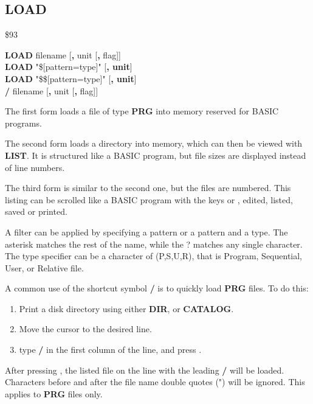 
\newpage
\subsection{LOAD}
\begin{description}[leftmargin=2cm,style=nextline]
\item [Token:] \$93
\item [Format:] {\bf LOAD} filename [{\bf,} unit [{\bf,} flag]] \\
                {\bf LOAD} "\$[pattern=type]" [{\bf, unit}] \\
                {\bf LOAD} "\$\$[pattern=type]" [{\bf, unit}] \\
                {\bf /} filename [{\bf,} unit [{\bf,} flag]]

\item [Usage:] The first form loads a file of type
   {\bf PRG} into memory reserved for BASIC programs.

The second form loads a directory into memory, which can then be viewed
with {\bf LIST}. It is structured like a BASIC program,
but file sizes are displayed instead of line numbers.

The third form is similar to the second one, but the files are numbered.
This listing can be scrolled like a BASIC program with the keys 
or , edited, listed, saved or printed.

A filter can be applied by specifying a pattern or a pattern and a type.
The asterisk \* matches the rest of the name, while the ? matches any single character.
The type specifier can be a character of (P,S,U,R), that is Program, Sequential, User,
or Relative file.

   A common use of the shortcut symbol {\bf /} is to quickly load
   {\bf PRG} files. To do this:

    \begin{enumerate}
    \item Print a disk directory using either {\bf DIR}, or {\bf CATALOG}.
    \item Move the cursor to the desired line.
    \item type {\bf /} in the first column of the line, and press .
    \end{enumerate}
   After pressing , the listed file on the line
    with the leading {\bf /} will be loaded.
    Characters before and after the file name double quotes (") will be ignored.
   This applies to {\bf PRG} files only.


\end{description}
